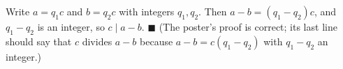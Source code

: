 Write $a=q_1c$ and $b=q_2c$ with integers $q_1,q_2$. Then $a-b=(q_1-q_2)c$, and $q_1-q_2$ is an integer, so $c\mid a-b$. $\blacksquare$ (The poster's proof is correct; its last line should say that $c$ divides $a-b$ because $a-b=c(q_1-q_2)$ with $q_1-q_2$ an integer.)
